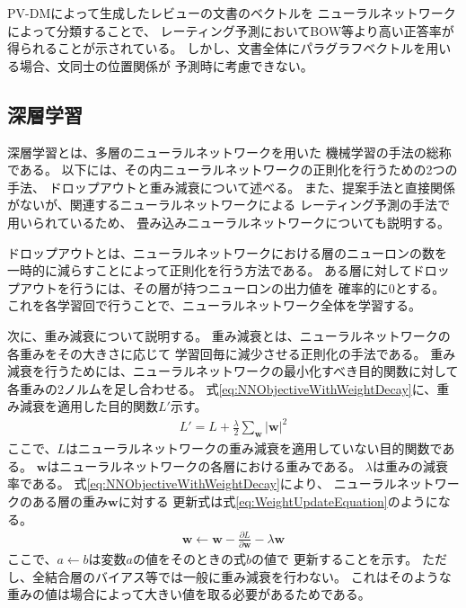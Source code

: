 PV-DMによって生成したレビューの文書のベクトルを
ニューラルネットワークによって分類することで、
レーティング予測においてBOW等より高い正答率が得られることが示されている。
しかし、文書全体にパラグラフベクトルを用いる場合、文同士の位置関係が
予測時に考慮できない。


\subsection{深層学習}

深層学習とは、多層のニューラルネットワークを用いた
機械学習の手法の総称である\cite{takayuki15}。
以下には、その内ニューラルネットワークの正則化を行うための2つの手法、
ドロップアウトと重み減衰について述べる。
また、提案手法と直接関係がないが、関連するニューラルネットワークによる
レーティング予測の手法\cite{nal14,rie14,duyu15}で用いられているため、
畳み込みニューラルネットワークについても説明する。

ドロップアウトとは、ニューラルネットワークにおける層のニューロンの数を
一時的に減らすことによって正則化を行う方法である。
ある層に対してドロップアウトを行うには、その層が持つニューロンの出力値を
確率的に0とする。
これを各学習回で行うことで、ニューラルネットワーク全体を学習する。

次に、重み減衰について説明する。
重み減衰とは、ニューラルネットワークの各重みをその大きさに応じて
学習回毎に減少させる正則化の手法である。
重み減衰を行うためには、ニューラルネットワークの最小化すべき目的関数に対して
各重みの2ノルムを足し合わせる。
式\ref{eq:NNObjectiveWithWeightDecay}に、重み減衰を適用した目的関数$L'$示す。
\begin{gather} \label{eq:NNObjectiveWithWeightDecay}
  L' = L + \frac{\lambda}{2} \sum_{\mathbf{w}} {|\mathbf{w}|}^2
\end{gather}
ここで、$L$はニューラルネットワークの重み減衰を適用していない目的関数である。
$\mathbf{w}$はニューラルネットワークの各層における重みである。
$\lambda$は重みの減衰率である。
式\ref{eq:NNObjectiveWithWeightDecay}により、
ニューラルネットワークのある層の重み$\mathbf{w}$に対する
更新式は式\ref{eq:WeightUpdateEquation}のようになる。
\begin{gather} \label{eq:WeightUpdateEquation}
  \mathbf{w} \leftarrow \mathbf{w} - \frac{\partial L}{\partial \mathbf{w}}
                                   - \lambda \mathbf{w}
\end{gather}
ここで、$a \leftarrow b$は変数$a$の値をそのときの式$b$の値で
更新することを示す。
ただし、全結合層のバイアス等では一般に重み減衰を行わない。
これはそのような重みの値は場合によって大きい値を取る必要があるためである。

